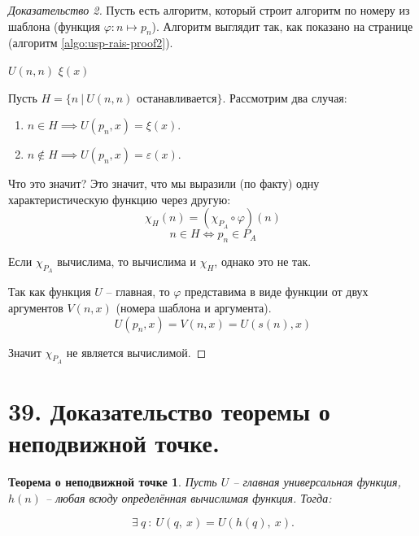 \documentclass[a4paper, 12pt]{article}
\newtheorem*{point}{Теорема о неподвижной точке}
\begin{document}
\begin{proof}[Доказательство 2]
    Пусть есть алгоритм, который строит алгоритм по номеру из шаблона
    (функция $\varphi : n \mapsto p_n$). Алгоритм выглядит так, как показано
    на странице \pageref{algo:usp-rais-proof2} (алгоритм \ref{algo:usp-rais-proof2}).

    \begin{algorithm}
        \caption{Шаблон алгоритма $p_n$ для функции $\varphi$ в док-ве 2}
        \label{algo:usp-rais-proof2}
        \begin{algorithmic}
                \State $U(n, n)$
                \State \Return $\xi(x)$
            \EndFunction
        \end{algorithmic}
    \end{algorithm}

    Пусть $H = \{ n\ |\ U(n, n) \text{ останавливается} \}$.
    Рассмотрим два случая:
    \begin{enumerate}
        \item $n \in H \implies U(p_n, x) = \xi(x)$.
        \item $n \notin H \implies U(p_n, x) = \varepsilon(x)$.
    \end{enumerate}
    Что это значит? Это значит, что мы выразили (по факту)
    одну характеристическую функцию через другую:
    \[ \chi_H(n) = (\chi_{P_A} \circ \varphi)(n) \]
    \[ n \in H \iff p_n \in P_A \]

    Если $\chi_{P_A}$ вычислима, то вычислима и $\chi_H$, однако это не так.

    Так как функция $U$ -- главная, то $\varphi$ представима в виде функции
    от двух аргументов $V(n, x)$ (номера шаблона и аргумента).
    \[ U(p_n, x) = V(n, x) = U(s(n), x) \]

    Значит $\chi_{P_A}$ не является вычислимой.

\end{proof}

\section*{39. Доказательство теоремы о неподвижной точке.}

\begin{point}
    Пусть $U$ -- главная универсальная функция, $h(n)$ -- любая всюду определённая вычислимая функция. Тогда:
    
    \[
        \exists\ q \ : \ U(q,\ x) = U(h(q),\ x).
    \]
\end{point}
\end{document}
